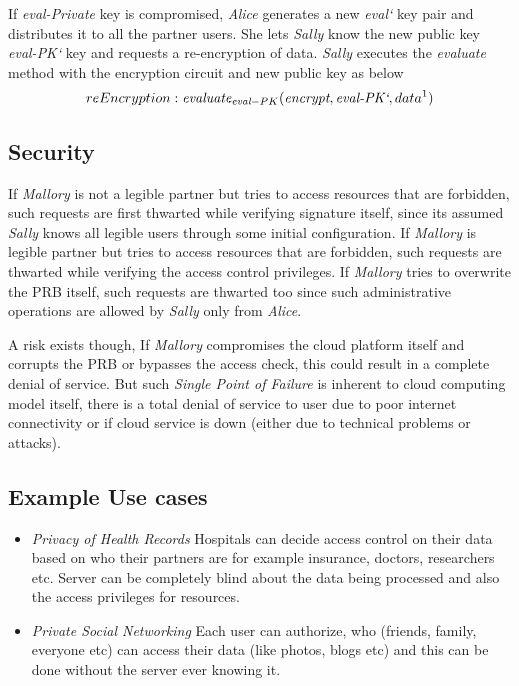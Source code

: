 \documentclass[conference]{IEEEtran}
\numberwithin{equation}{section}
\begin{document}
If \emph{eval-Private} key is compromised, \emph{Alice} generates a new \emph{eval`} key  pair and distributes it to all the partner users. She lets \emph{Sally} know the new public key \emph{eval-PK`} key and requests a re-encryption of data. \emph{Sally} executes the \emph{evaluate} method with the encryption circuit and new public key as below 
\begin{equation*}
reEncryption :  \emph{evaluate}_{\emph{eval}-PK}(\emph{encrypt},\emph{eval-PK`},data^1)
\end{equation*}
\subsection{Security}

If \emph{Mallory} is not a legible partner but tries to access resources that are forbidden, such requests are first thwarted while verifying signature itself, since its assumed \emph{Sally} knows all legible users through some initial configuration.
If \emph{Mallory} is legible partner but tries to access resources that are forbidden, such requests are thwarted while verifying the access control privileges. If \emph{Mallory} tries to overwrite the PRB itself, such requests are thwarted too since such administrative operations are allowed by \emph{Sally} only from \emph{Alice}. 

A risk exists though, If \emph{Mallory} compromises the cloud platform itself and corrupts the PRB or bypasses the access check, this could result in a complete denial of service. But such \emph{Single Point of Failure} is inherent to cloud computing model itself, there is a total denial of service to user due to poor internet connectivity or if cloud service is down (either due to technical problems or attacks).
\subsection{Example Use cases}
   \begin{itemize}
\item \emph{Privacy of Health Records} Hospitals can decide access control on  their data based on who their partners are for example insurance, doctors, researchers etc. Server can be completely blind about the data being processed and also the access privileges for resources.
\item \emph{Private Social Networking} Each user can authorize, who (friends, family, everyone etc) can access their data (like photos, blogs etc) and this can be done without the server ever knowing it.
\end{itemize}
\end{document}
